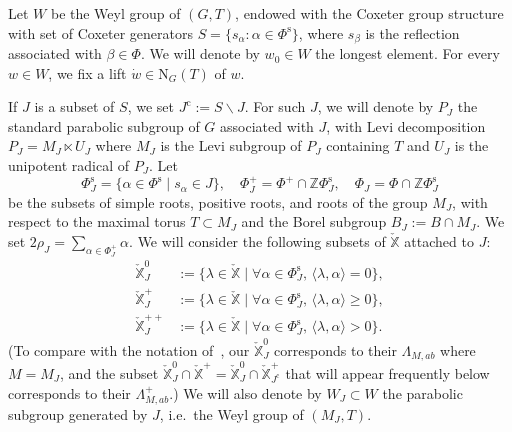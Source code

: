 \documentclass[11pt]{amsart}
\numberwithin{equation}{section}
\theoremstyle{plain}
\theoremstyle{definition}
\newcommand{\X}{{\mathbb X}}
\newcommand{\Xd}{\check{\X}}
\newcommand{\Z}{{\mathbb Z}}
\newcommand{\Phis}{\Phi^{\mathrm{s}}}
\newcommand{\comp}{\mathrm{c}}
\begin{document}
Let $W$ be the Weyl group of $(G,T)$, endowed with the Coxeter group structure with set of Coxeter generators $S=\{s_\alpha : \alpha\in \Phis\}$, where $s_\beta$ is the reflection associated with $\beta\in \Phi$. 
We will denote by $w_0\in W$ the longest element. 
For every $w \in W$, we fix a lift $\dot{w}\in \mathrm{N}_G(T)$ of $w$. 

If $J$ is a subset of $S$, we set $J^\comp:=S\smallsetminus J$. 
For such $J$, we will denote by $P_J$ the standard parabolic subgroup of $G$ associated with $J$, with Levi decomposition $P_J=M_J\ltimes U_{J}$ where $M_J$ is the Levi subgroup of $P_J$ containing $T$ and $U_{J}$ is the unipotent radical of $P_J$. 
Let
\[
\Phis_J=\{\alpha\in \Phis \mid s_\alpha\in J\}, \quad \Phi^+_J=\Phi^+ \cap \Z\Phis_J, \quad \Phi_J=\Phi \cap \Z\Phis_J
\]
be the subsets of simple roots, positive roots, and roots of the group $M_J$, with respect to the maximal torus $T \subset M_J$ and the Borel subgroup $B_J:=B \cap M_J$. 
We set $2\rho_J=\sum_{\alpha\in \Phi^+_J} \alpha$. 
We will consider the following subsets of $\Xd$ attached to $J$:
\begin{align*}
\Xd_J^0 &:=\{\lambda\in \Xd \mid \forall \alpha\in \Phis_J, \, \langle \lambda, \alpha\rangle = 0\}, \\
\Xd^+_J &:=\{\lambda\in \Xd \mid \forall \alpha\in \Phis_J, \, \langle \lambda, \alpha\rangle \geq 0\}, \\
\Xd^{++}_J &:=\{\lambda\in \Xd \mid \forall \alpha\in \Phis_J, \, \langle \lambda, \alpha\rangle > 0\}. 
\end{align*}
(To compare with the notation of~\cite{DL23}, our $\Xd_J^0$ corresponds to their $\Lambda_{M,ab}$ where $M=M_J$, and the subset $\Xd_J^0 \cap \Xd^+=\Xd_J^0 \cap \Xd_{J^\comp}^+$ that will appear frequently below corresponds to their $\Lambda_{M,ab}^+$.) We will also denote by $W_J \subset W$ the parabolic subgroup generated by $J$, i.e.~the Weyl group of $(M_J,T)$.

\end{document}
